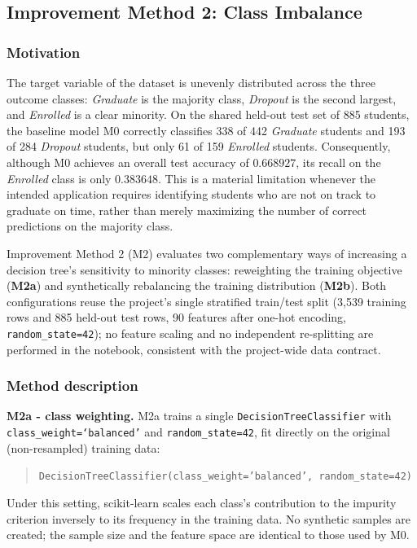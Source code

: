 
\subsection{Improvement Method 2: Class Imbalance}
\label{sec:f2}

\subsubsection{Motivation}
\label{sec:f2-motivation}

The target variable of the dataset is unevenly distributed across the three outcome
classes: \textit{Graduate} is the majority class, \textit{Dropout} is the second
largest, and \textit{Enrolled} is a clear minority. On the shared held-out test set
of 885 students, the baseline model M0 correctly classifies 338 of 442
\textit{Graduate} students and 193 of 284 \textit{Dropout} students, but only 61 of
159 \textit{Enrolled} students. Consequently, although M0 achieves an overall test
accuracy of $0.668927$, its recall on the \textit{Enrolled} class is only
$0.383648$. This is a material limitation whenever the intended application requires
identifying students who are not on track to graduate on time, rather than merely
maximizing the number of correct predictions on the majority class.

Improvement Method 2 (M2) evaluates two complementary ways of increasing a decision
tree's sensitivity to minority classes: reweighting the training objective
(\textbf{M2a}) and synthetically rebalancing the training distribution
(\textbf{M2b}). Both configurations reuse the project's single stratified
train/test split
(3{,}539 training rows and 885 held-out test rows, 90 features after one-hot
encoding, \texttt{random\_state=42}); no feature scaling and no independent
re-splitting are performed in the notebook, consistent with the project-wide data
contract.

\subsubsection{Method description}
\label{sec:f2-method}

\textbf{M2a - class weighting.} M2a trains a single
\texttt{DecisionTreeClassifier} with \texttt{class\_weight=}\allowbreak\texttt{`balanced'} and
\texttt{random\_state=42}, fit directly on the original (non-resampled) training
data:
\begin{quote}
\texttt{DecisionTreeClassifier(class\_weight='balanced', random\_state=42)}
\end{quote}
Under this setting, scikit-learn scales each class's contribution to the impurity
criterion inversely to its frequency in the training data. No synthetic samples are
created; the sample size and the feature space are identical to those used by M0.

